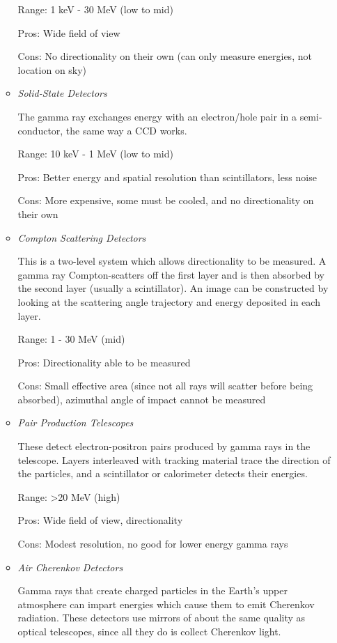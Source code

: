 \begin{enumerate}
\begin{itemize}
      Range: 1 keV - 30 MeV (low to mid)
      
      Pros: Wide field of view
      
      Cons: No directionality on their own (can only measure energies, not location on sky)
      
      \item \emph{Solid-State Detectors}
      
      The gamma ray exchanges energy with an electron/hole pair in a semi-conductor, the same way a CCD works. 
      
      Range: 10 keV - 1 MeV (low to mid)
      
      Pros: Better energy and spatial resolution than scintillators, less noise
      
      Cons: More expensive, some must be cooled, and no directionality on their own
      
      \item \emph{Compton Scattering Detectors}
      
      This is a two-level system which allows directionality to be measured. A gamma ray Compton-scatters off the first layer and is then absorbed by the second layer (usually a scintillator). An image can be constructed by looking at the scattering angle trajectory and energy deposited in each layer.
      
      Range: 1 - 30 MeV (mid)
      
      Pros: Directionality able to be measured
      
      Cons: Small effective area (since not all rays will scatter before being absorbed), azimuthal angle of impact cannot be measured
      
      \item \emph{Pair Production Telescopes}
      
      These detect electron-positron pairs produced by gamma rays in the telescope. Layers interleaved with tracking material trace the direction of the particles, and a scintillator or calorimeter detects their energies.
      
      Range: >20 MeV (high)
      
      Pros: Wide field of view, directionality
      
      Cons: Modest resolution, no good for lower energy gamma rays
      
      \item \emph{Air Cherenkov Detectors}
      
      Gamma rays that create charged particles in the Earth's upper atmosphere can impart energies which cause them to emit Cherenkov radiation. These detectors use mirrors of about the same quality as optical telescopes, since all they do is collect Cherenkov light.
      

\end{itemize}
\end{enumerate}
